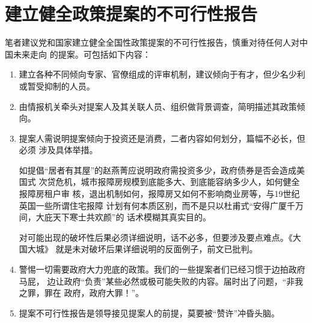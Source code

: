 




\section{建立健全政策提案的不可行性报告}

笔者建议党和国家建立健全全国性政策提案的不可行性报告，慎重对待任何人对中国未来走向
的提案。可包括如下内容：
\begin{enumerate}
\item 建立各种不同倾向专家、官僚组成的评审机制，建议倾向于有才，但少名少利或暂受抑制的人员。

\item 由情报机关牵头对提案人及其关联人员、组织做背景调查，简明描述其政策倾向。

\item 提案人需说明提案倾向于投资还是消费，二者内容如何划分，篇幅不必长，但必须
  涉及具体举措。

  如提倡“居者有其屋”的赵燕菁应说明政府需投资多少，政府债券是否会造成美国式
  次贷危机，城市报障房规模到底能多大、到底能容纳多少人，如何健全报障房租户审
  核，退出机制如何，报障房又如何不影响商业房等，与19世纪英国一些所谓住宅报障
  计划有何本质区别，而不是只以杜甫式“安得广厦千万间，大庇天下寒士共欢颜”的
  话术模糊其真实目的。

  对可能出现的破坏性后果必须详细说明，话不必多，但要涉及要点难点。《大国大城》
  就是未对破坏后果详细说明的反面例子，前文已批判。

\item 警惕一切需要政府大力兜底的政策。我们的一些提案者们已经习惯于边拍政府马屁，
  边让政府“负责”某些必然或极可能失败的内容。届时出了问题，“非我之罪，罪在
  政府，政府大罪！”。

\item 提案不可行性报告是领导接见提案人的前提，莫要被“赞许”冲昏头脑。
\end{enumerate}


